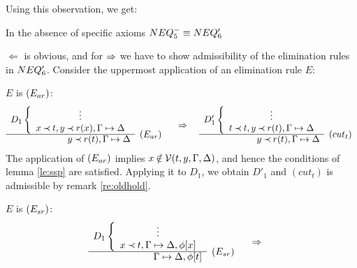 \noindent
Using this observation, we get:
%
\begin{CLAIM}\label{le:spneqiselneq}
In the absence of specific axioms $NEQ_5^- \equiv NEQ_6'$
\end{CLAIM}
\begin{PROOF}
 $\Leftarrow$ is obvious, and for $\mathrel\Rightarrow$ we have to show admissibility of
 the elimination rules in $NEQ_6'$. Consider the uppermost application of an
 elimination rule $E$:
\begin{LS}
\item $E$ is $(E_{ar})$: %
 \[ \begin{array}{rl}
D_1 \left \{ \begin{array}{c}
\vdots \\
 x\Incl t, y\Incl r(x),\GSD \end{array} \right . \\ \cline{1-1}
 y\Incl r(t), \GSD & \rabove{\Ear} \end{array} 
\conv 
\begin{array}{rl}
D_1' \left \{ \begin{array}{c}
\vdots \\
 t\Incl t, y\Incl r(t),\GSD \end{array} \right . \\ \cline{1-1}
 y\Incl r(t), \GSD & \rabove{(cut_t)} \end{array} 
\]
The application of $(E_{ar})$ implies $x\not\in\Vars(t,y,\Gamma,\Delta)$, and hence the
conditions of lemma \ref{le:ssp} are satisfied. Applying it to $D_1$, we
obtain $D'_1$ and $(cut_t)$ is admissible by remark \ref{re:oldhold}.
\item $E$ is $(E_{sr})$:
 \[ \begin{array}{rl}
      D_1 \left \{ \begin{array}{c}
         \vdots \\
        x\Incl t,\GSD, \phi[x] \end{array} \right . \\ \cline{1-1}
     \GSD, \phi[t] & \rabove{\Esr} \end{array} 
\conv
\begin{array}{rl}

\end{array}\]
\end{LS}
\end{PROOF}
